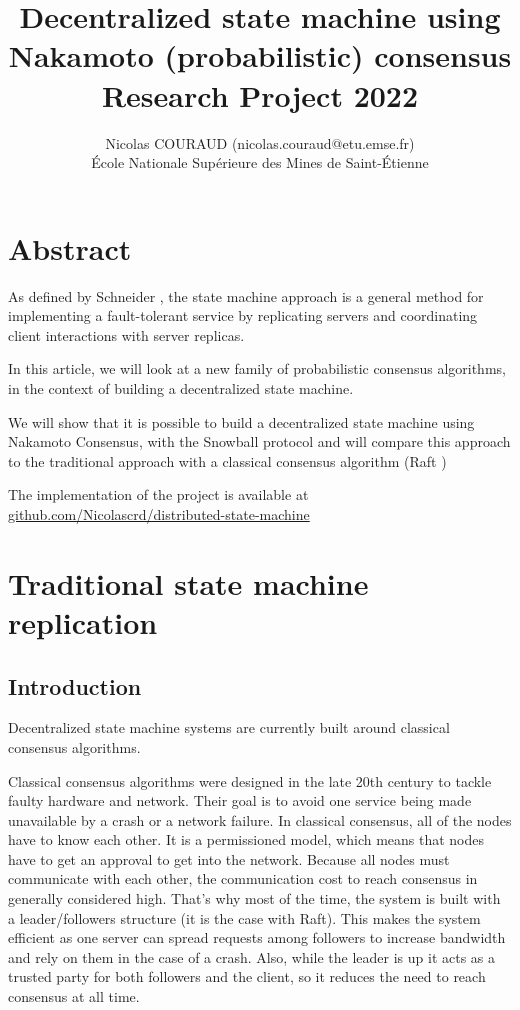\documentclass[11pt, twocolumn]{article}
\title{Decentralized state machine using Nakamoto (probabilistic) consensus\\\medskip Research Project 2022}
\author{Nicolas COURAUD (nicolas.couraud@etu.emse.fr)\\École Nationale Supérieure des Mines de Saint-Étienne}
\begin{document}
\maketitle
\onecolumn
\section*{Abstract}

As defined by Schneider \cite{stateMachine}, the state machine approach is a general method for implementing a fault-tolerant service
by replicating servers and coordinating client interactions with server replicas.

In this article, we will look at a new family of probabilistic consensus algorithms, in the context of building a decentralized state machine.

We will show that it is possible to build a decentralized state machine using Nakamoto Consensus, with the Snowball protocol \cite{snowprotocol} and will compare this approach to the traditional approach with
a classical consensus algorithm (Raft \cite{understandable})

The implementation of the project is available at \href{https://github.com/Nicolascrd/distributed-state-machine}{github.com/Nicolascrd/distributed-state-machine}


\tableofcontents

\section{Traditional state machine replication}

\subsection{Introduction}

Decentralized state machine systems are currently built around classical consensus algorithms.

Classical consensus algorithms were designed in the late 20th century to tackle faulty hardware and network. Their goal is to avoid one service being made unavailable by a crash or a network failure.
In classical consensus, all of the nodes have to know each other. It is a permissioned model, which means that nodes have to get an approval to get into the network.
Because all nodes must communicate with each other, the communication cost to reach consensus in generally considered high. That's why most of the time, the system is built with a leader/followers structure (it is the case with Raft).
This makes the system efficient as one server can spread requests among followers to increase bandwidth and rely on them in the case of a crash. Also, while the leader is up it acts as a trusted party for both followers and the client, so it reduces the need to reach consensus at all time.
\end{document}
